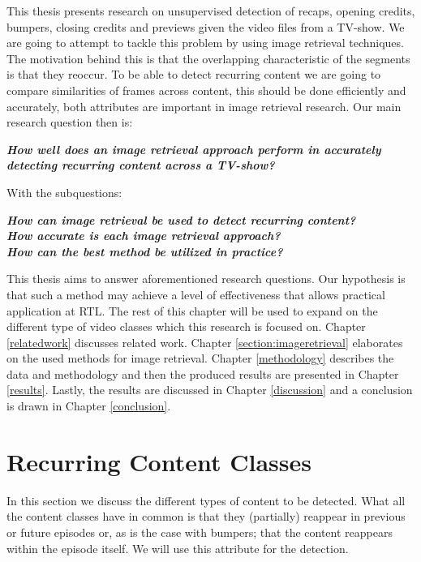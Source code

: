 \documentclass{report}
\begin{document}
This thesis presents research on unsupervised detection of recaps, opening credits, bumpers, closing credits and previews given the video files from a TV-show. We are going to attempt to tackle this problem by using image retrieval techniques. The motivation behind this is that the overlapping characteristic of the segments is that they reoccur. To be able to detect recurring content we are going to compare similarities of frames across content, this should be done efficiently and accurately, both attributes are important in image retrieval research. Our main research question then is:
\newline
\begin{adjustwidth}{0.3in}{0.3in}
\textit{\textbf{How well does an image retrieval approach perform in accurately detecting recurring content across a TV-show?\newline}}
\end{adjustwidth}
With the subquestions: \\
\begin{adjustwidth}{0.3in}{0.3in}
	\textit{\textbf{How can image retrieval be used to detect recurring content?\newline}}\\
	\textit{\textbf{How accurate is each image retrieval approach?\newline}}\\
	\textit{\textbf{How can the best method be utilized in practice?\newline}}
\end{adjustwidth}
This thesis aims to answer aforementioned research questions. Our hypothesis is that such a method may achieve a level of effectiveness that allows practical application at RTL. The rest of this chapter will be used to expand on the different type of video classes which this research is focused on. Chapter \ref{relatedwork} discusses related work. Chapter \ref{section:imageretrieval} elaborates on the used methods for image retrieval. Chapter \ref{methodology} describes the data and methodology and then the produced results are presented in Chapter \ref{results}. Lastly, the results are discussed in Chapter \ref{discussion} and a conclusion is drawn in Chapter \ref{conclusion}.

\section{Recurring Content Classes} \label{section:segmentclasses}
In this section we discuss the different types of content to be detected. What all the content classes have in common is that they (partially) reappear in previous or future episodes or, as is the case with bumpers; that the content reappears within the episode itself. We will use this attribute for the detection.
\end{document}
